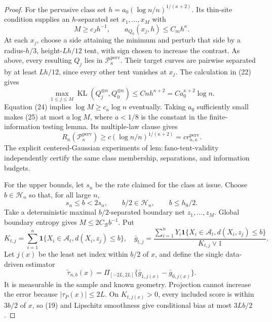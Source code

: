 \documentclass{article}
\begin{document}
\begin{proof}
For the pervasive class set
\(h=a_0(\log n/n)^{1/(\kappa+2)}\).  Its thin-site condition supplies an
\(h\)-separated set \(x_1,\ldots,x_M\) with
\[
 M\ge c_Jh^{-1},
 \qquad a_{Q_0}(x_j,h)\le C_mh^{\kappa}.
 \tag{24}
\]
At each \(x_j\), choose a side attaining the minimum and perturb that side
by a radius-\(h/3\), height-\(Lh/12\) tent, with sign chosen to increase
the contrast.  As above, every resulting \(Q_j\) lies in
\(\mathcal P_{\kappa}^{\mathrm{perv}}\).  Their target curves are pairwise
separated by at least \(Lh/12\), since every other tent vanishes at
\(x_j\).  The calculation in (22) gives
\[
 \max_{1\le j\le M}\operatorname{KL}(Q_j^{\otimes n},Q_0^{\otimes n})
 \le Cnh^{\kappa+2}=Ca_0^{\kappa+2}\log n.
 \tag{25}
\]
Equation (24) implies \(\log M\ge c_{\kappa}\log n\) eventually.  Taking
\(a_0\) sufficiently small makes (25) at most \(a\log M\), where
\(a<1/8\) is the constant in the finite-information testing lemma.  Its
multiple-law clause gives
\[
 R_n(\mathcal P_{\kappa}^{\mathrm{perv}})
 \ge c(\log n/n)^{1/(\kappa+2)}
 =c r_{n,\kappa}^{\mathrm{perv}}.
 \tag{26}
\]
The explicit centered-Gaussian experiments of
\(\mathrm{lem:fano\text{-}tent\text{-}validity}\) independently certify
the same class membership, separations, and information budgets.

For the upper bounds, let \(s_n\) be the rate claimed for the class at
issue.  Choose \(b\in\mathcal H_n\) so that, for all large \(n\),
\[
 s_n\le b<2s_n,
 \qquad b/2\in\mathcal H_n,
 \qquad b\le h_0/2.
 \tag{27}
\]
Take a deterministic maximal \(b/2\)-separated boundary net
\(z_1,\ldots,z_M\).  Global boundary entropy gives
\(M\le2C_{\mathcal B}b^{-1}\).  Put
\[
 K_{t,j}=\sum_{i=1}^n\mathbf1\{X_i\in\mathcal A_t,
                    d(X_i,z_j)\le b\},
 \quad
 \bar g_{t,j}=\frac{\sum_{i=1}^nY_i\mathbf1\{X_i\in\mathcal A_t,
                    d(X_i,z_j)\le b\}}{K_{t,j}\vee1}.
\]
Let \(j(x)\) be the least net index within \(b/2\) of \(x\), and define
the single data-driven estimator
\[
 \widetilde\tau_{n,b}(x)=
 \Pi_{[-2L,2L]}\{\bar g_{1,j(x)}-\bar g_{0,j(x)}\}.
 \tag{28}
\]
It is measurable in the sample and known geometry.  Projection cannot
increase the error because \(|\tau_P(x)|\le2L\).  On
\(K_{t,j(x)}>0\), every included score is within \(3b/2\) of \(x\), so
(19) and Lipschitz smoothness give conditional bias at most \(3Lb/2\).


\end{proof}
\end{document}
